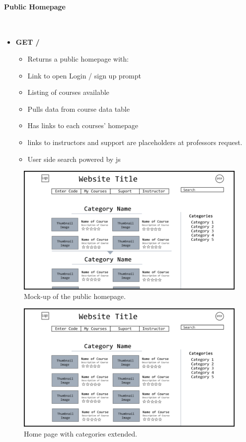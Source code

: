 \documentclass{article}
\begin{document}
\paragraph{Public Homepage}\\ 
\begin{itemize}
    \item \textbf{GET /}
    \begin{itemize}
        \item Returns a public homepage with:
        \item Link to open Login / sign up prompt
        \item Listing of courses available
        \item Pulls data from course data table
        \item Has links to each courses' homepage
        \item links to instructors and support are placeholders at professors request.
        \item User side search powered by js
    \end{itemize}
\end{itemize}
\begin{figure}[h]
    \caption{Mock-up of the public homepage.}
    \includegraphics[width=\textwidth]{home_page}
\end{figure}
\begin{figure}[h]
    \caption{Home page with categories extended.}
    \includegraphics[width=\textwidth]{hompage_expanded}
\end{figure}
\end{document}
